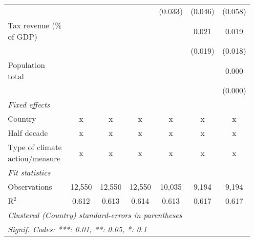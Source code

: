\begin{tabular}{lcccccc}
                                                   &         &               &                & (0.033)        & (0.046)        & (0.058)\\   
   Tax revenue (\% of GDP)                         &         &               &                &                & 0.021          & 0.019\\   
                                                   &         &               &                &                & (0.019)        & (0.018)\\   
   Population total                                &         &               &                &                &                & 0.000\\   
                                                   &         &               &                &                &                & (0.000)\\   
   \emph{Fixed effects}\\
   Country                                         & x       & x             & x              & x              & x              & x\\  
   Half decade                                     & x       & x             & x              & x              & x              & x\\  
   Type of climate action/measure                  & x       & x             & x              & x              & x              & x\\  
   \midrule \emph{Fit statistics}\\
   Observations                                    & 12,550  & 12,550        & 12,550         & 10,035         & 9,194          & 9,194\\  
   R$^2$                                           & 0.612   & 0.613         & 0.614          & 0.613          & 0.617          & 0.617\\  
   \midrule
   \multicolumn{7}{l}{\emph{Clustered (Country) standard-errors in parentheses}}\\
   \multicolumn{7}{l}{\emph{Signif. Codes: ***: 0.01, **: 0.05, *: 0.1}}\\
\end{tabular}
\par\endgroup


